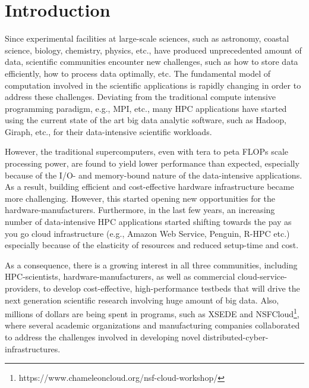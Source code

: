 \documentclass[conference]{IEEEtran}
\begin{document}

%
\IEEEpeerreviewmaketitle



\section {Introduction}
Since experimental facilities at large-scale sciences, such as astronomy, coastal science, biology, chemistry, physics, etc., have produced unprecedented amount of data, scientific communities encounter new challenges, such as how to store data efficiently, how to process data optimally, etc. The fundamental model of computation involved in the scientific applications is rapidly changing in order to address these challenges. Deviating from the traditional compute intensive programming paradigm, e.g., MPI, etc., many HPC applications have started using the current state of the art big data analytic software, such as Hadoop, Giraph, etc., for their data-intensive scientific workloads. 

However, the traditional supercomputers, even with tera to peta FLOPs scale processing power, are found to yield lower performance than expected, especially because of the I/O- and memory-bound nature of the data-intensive applications. As a result, building efficient and cost-effective hardware infrastructure became more challenging. However, this started opening new opportunities for the hardware-manufacturers. Furthermore, in the last few years, an increasing number of data-intensive HPC applications started shifting towards the pay as you go cloud infrastructure (e.g., Amazon Web Service, Penguin, R-HPC etc.) especially because of the elasticity of resources and reduced setup-time and cost. 

As a consequence, there is a growing interest in all three communities, including HPC-scientists, hardware-manufacturers, as well as commercial cloud-service-providers, to develop cost-effective, high-performance testbeds that will drive the next generation scientific research involving huge amount of big data. Also, millions of dollars are being spent in programs, such as XSEDE and NSFCloud\footnote{https://www.chameleoncloud.org/nsf-cloud-workshop/}, where several academic organizations and manufacturing companies collaborated to address the challenges involved in developing novel distributed-cyber-infrastructures. 
\end{document}
